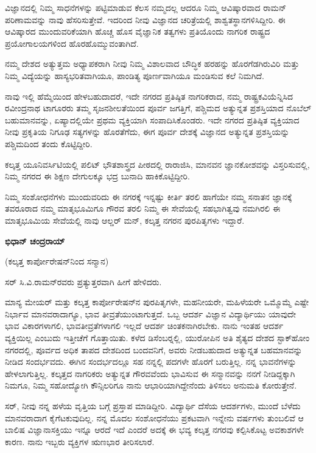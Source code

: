 ವಿಜ್ಞಾನದಲ್ಲಿ ನಿಮ್ಮ ಸಾಧನೆಗಳನ್ನು ಪಟ್ಟಿಮಾಡುವ ಕೆಲಸ ನಮ್ಮದಲ್ಲ ಆದರೂ ನಿಮ್ಮ ಆವಿಷ್ಕಾರವಾದ ರಾಮನ್ ಪರಿಣಾಮವನ್ನು ನಾವು ಹೆಸರಿಸುತ್ತೇವೆ. ಇದರಿಂದ ನೀವು ವಿಜ್ಞಾನದ ಚರಿತ್ರೆಯಲ್ಲಿ ಶಾಶ್ವತಸ್ಥಾನಗಳಿಸಿದ್ದೀರಿ. ಈ ಆವಿಷ್ಕಾರದ ಮುಂದುವರಿಕೆಯಾಗಿ ಹೊಚ್ಚ ಹೊಸ ವೈಜ್ಞಾನಿಕ ತತ್ವಗಳು ಪ್ರತಿಯೊಂದು ನಾಗರಿಕ ರಾಷ್ಟ್ರದ ಪ್ರಯೋಗಾಲಯಗಳಿಂದ ಹೊರಹೊಮ್ಮುವಂತಾಗಿದೆ.

ನಮ್ಮ ದೇಶದ ಅತ್ಯುತ್ತಮ ಅಧ್ಯಾಪಕರಾಗಿ ನೀವು ನಿಮ್ಮ ವಿಶಾಲವಾದ ಬೌದ್ಧಿಕ ಹರಹನ್ನು ಹೊರಗೆಡಗಿರುವಿರಿ ಮತ್ತು ನಿಮ್ಮ ವಿದ್ಯೆಯನ್ನು ಹಾಸ್ಯಭರಿತವಾಗಿಯೂ, ಪಾಂಡಿತ್ಯ ಪೂರ್ಣವಾಗಿಯೂ ಮಂಡಿಸುವ ಕಲೆ ನಿಮಗಿದೆ.

ನಾವು ಇಲ್ಲಿ ಹೆಮ್ಮೆಯಿಂದ ಹೇಳಬಹುದಾದರೆ, ಇದೇ ನಗರದ ಪ್ರತಿಷ್ಠಿತ ನಾಗರಿಕರಾದ, ನಮ್ಮ ರಾಷ್ಟ್ರಕವಿಯೆನ್ನಿಸಿದ ರವೀಂದ್ರನಾಥ ಟಾಗೂರರು ತಮ್ಮ ಸೃಜನಶೀಲತೆಯಿಂದ ಪೂರ್ವ ಜಗತ್ತಿಗೆ, ಪಶ್ಚಿಮದ ಅತ್ಯುನ್ನತ ಪ್ರಶಸ್ತಿಯಾದ ನೊಬೆಲ್ ಬಹುಮಾನವನ್ನು, ಏಷ್ಯಾದಲ್ಲಿಯೇ ಪ್ರಥಮ ವ್ಯಕ್ತಿಯಾಗಿ ಸಂಪಾದಿಸಿಕೊಂಡರು. ಇದೇ ನಗರದ ಪ್ರತಿಷ್ಠಿತ ವ್ಯಕ್ತಿಯಾದ ನೀವು ಪ್ರಕೃತಿಯ ನಿಗೂಢ ಸತ್ಯಗಳನ್ನು ಹೊರತೆಗೆದು, ಈಗ ಪೂರ್ವ ದೇಶಕ್ಕೆ ವಿಜ್ಞಾನದ ಅತ್ಯುನ್ನತ ಪ್ರಶಸ್ತಿಯನ್ನು ಪಶ್ಚಿಮದಿಂದ ತಂದು ಕೊಟ್ಟಿದ್ದೀರಿ.

ಕಲ್ಕತ್ತ ಯೂನಿವರ್ಸಿಟಿಯಲ್ಲಿ ಪಲಿಟ್ ಭೌತಶಾಸ್ತ್ರದ ಪೀಠದಲ್ಲಿ ರಾರಾಜಿಸಿ, ಮಾನವನ ಜ್ಞಾನಕೋಶವನ್ನು ವಿಸ್ತರಿಸುವಲ್ಲಿ, ನಿಮ್ಮ ನಗರದ ಈ ಶಿಕ್ಷಣ ದೇಗುಲಕ್ಕೂ ಭದ್ರ ಬುನಾದಿ ಹಾಕಿಕೊಟ್ಟಿದ್ದೀರಿ.

ನಿಮ್ಮ ಸಂಶೋಧನೆಗಳು ಮುಂದುವರಿದು ಈ ನಗರಕ್ಕೆ ಇನ್ನಷ್ಟು ಕೀರ್ತಿ ತರಲಿ ಹಾಗೆಯೇ ನಮ್ಮ ಸನಾತನ ಜ್ಞಾನಕ್ಕೆ ತವರೂರಾದ ನಮ್ಮ ಮಾತೃಭೂಮಿಗೂ ಗೌರವ ತರಲಿ ನಿಮ್ಮ ಈ ಸೇವೆಯಲ್ಲಿ ಸಹಭಾಗಿತ್ವವು ನಮಗಿರಲಿ ಈ ಮಾತೃಭೂಮಿಯ ಸೇವೆಯಲ್ಲಿ ನಾವು ಆಲ್ಡರ್ ಮನ್, ಕಲ್ಕತ್ತ ನಗರನ ಪುರಪಿತೃಗಳು ಇದ್ದಾರೆ.

\begin{flushright}
\textbf{ಭಿಧಾನ್ ಚಂದ್ರರಾಯ್}
\end{flushright}

(ಕಲ್ಕತ್ತ ಕಾರ್ಪೋರೇಷನ್‍ನಿಂದ ಸನ್ಮಾನ)

ಸರ್ ಸಿ.ವಿ.ರಾಮನ್‍ರವರು ಪ್ರತ್ಯುತ್ತರವಾಗಿ ಹೀಗೆ ಹೇಳಿದರು.

ಮಾನ್ಯ ಮೇಯರ್ ಮತ್ತು ಕಲ್ಕತ್ತ ಕಾರ್ಪೋರೇಷನ್‍ನ ಪುರಪಿತೃಗಳೇ, ಮಹನೀಯರೇ, ಮಹಿಳೆಯರೇ ಒಮ್ಮೊಮ್ಮೆ ಎಷ್ಟೇ ನಿರ್ಭಾವ ಮಾನವರಾದಾಗ್ಯೂ, ಭಾವ ತೀವ್ರತೆಯುಂಟಾಗುತ್ತದೆ. ಒಬ್ಬ ಆದರ್ಶ ವಿಜ್ಞಾನ ವಿದ್ಯಾರ್ಥಿಯು ಯಾವುದೇ ಭಾವ ವಿಕಾರಗಳಾಗಲಿ, ಭಾವತೀವ್ರತೆಗಳಾಗಲಿ ಇಲ್ಲದೆ ಆದರ್ಶ ಚಿಂತಕನಾಗಿರಬೇಕು. ನಾನು ಇಂತಹ ಆದರ್ಶ ವ್ಯಕ್ತಿಯಿಲ್ಲ ಎಂಬುದು ಇತ್ತೀಚೆಗೆ ಗೊತ್ತಾಯಿತು. ಕಳೆದ ಡಿಸೆಂಬರ್‍ನಲ್ಲಿ, ಯುರೋಪಿನ ಅತಿ ಶೈತ್ಯದ ದೇಶದ ಸ್ಟಾಕ್‍ಹೋಂ ನಗರದಲ್ಲಿ, ಪೂರ್ವದ ಅಧಿಕ ತಾಪದ ದೇಶದಿಂದ ಬಂದವನಿಗೆ, ಅವರು ನೀಡಬಹುದಾದ ಅತ್ಯುನ್ನತ ಬಹಮಾನವನ್ನು ನೀಡಿದ ಸಂದರ್ಭವದು. ಈಗಿನ ಸಂದರ್ಭದಲ್ಲೂ ಸಹ ನನ್ನಲ್ಲಿ ಪದಗಳೇ ಹೊರಗೆ ಬರುತ್ತಿಲ್ಲ. ನನ್ನ ಭಾವನೆಗಳನ್ನು ಹೇಳಲಾಗುತ್ತಿಲ್ಲ. ಕಲ್ಕತ್ತದ ನಾಗರಿಕರು ಅತ್ಯುನ್ನತ ಗೌರವವೆಂದು ಭಾವಿಸುವ ಈ ಸನ್ಮಾನವನ್ನು ನನಗೆ ನೀಡಿದ್ದಕ್ಕಾಗಿ ನಿಮಗೂ, ನಿಮ್ಮ ಸಹೋದ್ಯೋಗಿ ಕೌನ್ಸಿಲರಿಗೂ ನಾನು ಆಭಾರಿಯಾಗಿದ್ದೇನೆಂದು ತಿಳಿಸಲು ಅನುಮತಿ ಕೋರುತ್ತೇನೆ.

ಸರ್, ನೀವು ನನ್ನ ಹಳೆಯ ವೃತ್ತಿಯ ಬಗ್ಗೆ ಪ್ರಸ್ತಾಪ ಮಾಡಿದ್ದೀರಿ. ವಿದ್ಯಾರ್ಥಿ ದೆಸೆಯ ಆದರ್ಶಗಳು, ಮುಂದೆ ಬೆಳೆದು ಮಾನವರಾದಾಗ ಕೈಗೆಟಕುವುದಿಲ್ಲ. ನನ್ನ ಮೊದಲ ಸಂಶೋಧನೆಯು ಪ್ರಕಟವಾಗಿ ಇನ್ನೇನು  ವರ್ಷಗಳು ತುಂಬಲಿವೆ ಆ ಬಾಲಿಷ ವಿಜ್ಞಾನಾಸಕ್ತಿಯು ಇನ್ನೂ ಆರದೆ ಇದೆ ಎಂದರೆ ಅದಕ್ಕೆ ಈ ಭವ್ಯ ಕಲ್ಕತ್ತ ನಗರವು ಕಲ್ಪಿಸಿಕೊಟ್ಟ ಅವಕಾಶಗಳೇ ಕಾರಣ. ನಾನು ಇಬ್ಬರು ವ್ಯಕ್ತಿಗಳ ಋಣಭಾರ ತೀರಿಸಲಾರೆ.

